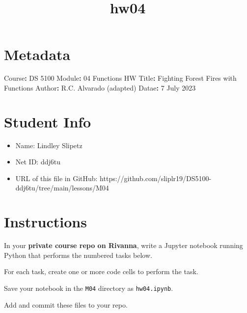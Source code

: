 \documentclass[11pt]{article}
\title{hw04}
\providecommand{\tightlist}{%
      \setlength{\itemsep}{0pt}\setlength{\parskip}{0pt}}
\newenvironment{Shaded}{}{}
\newcommand{\KeywordTok}[1]{\textcolor[rgb]{0.00,0.44,0.13}{\textbf{{#1}}}}
\newcommand{\FunctionTok}[1]{\textcolor[rgb]{0.02,0.16,0.49}{{#1}}}
\newcommand{\AttributeTok}[1]{\textcolor[rgb]{0.49,0.56,0.16}{{#1}}}
\begin{document}
    
    \maketitle
    
    

    
    \hypertarget{metadata}{%
\section{Metadata}\label{metadata}}

\begin{Shaded}
\begin{Highlighting}[]
\FunctionTok{Course}\KeywordTok{:}\AttributeTok{  DS 5100}
\FunctionTok{Module}\KeywordTok{:}\AttributeTok{  04 Functions HW}
\FunctionTok{Title}\KeywordTok{:}\AttributeTok{   Fighting Forest Fires with Functions}
\FunctionTok{Author}\KeywordTok{:}\AttributeTok{  R.C. Alvarado (adapted)}
\FunctionTok{Datae}\KeywordTok{:}\AttributeTok{   7 July 2023}
\end{Highlighting}
\end{Shaded}

    \hypertarget{student-info}{%
\section{Student Info}\label{student-info}}

\begin{itemize}
\tightlist
\item
  Name: Lindley Slipetz
\item
  Net ID: ddj6tu
\item
  URL of this file in GitHub:
  https://github.com/sliplr19/DS5100-ddj6tu/tree/main/lessons/M04
\end{itemize}

    \hypertarget{instructions}{%
\section{Instructions}\label{instructions}}

In your \textbf{private course repo on Rivanna}, write a Jupyter
notebook running Python that performs the numbered tasks below.

For each task, create one or more code cells to perform the task.

Save your notebook in the \texttt{M04} directory as \texttt{hw04.ipynb}.

Add and commit these files to your repo.
\end{document}

